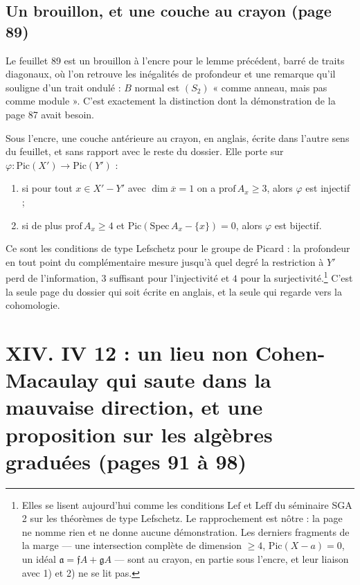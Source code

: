 \documentclass[11pt,a4paper]{article}
\begin{document}
\subsection*{Un brouillon, et une couche au crayon (page 89)}

Le feuillet 89 est un brouillon à l'encre pour le lemme précédent, barré de
traits diagonaux, où l'on retrouve les inégalités de profondeur et une remarque
qu'il souligne d'un trait ondulé : $B$ normal est $(S_{2})$ « comme anneau, mais
pas comme module ». C'est exactement la distinction dont la démonstration de la
page 87 avait besoin.

Sous l'encre, une couche antérieure au crayon, en anglais, écrite dans l'autre
sens du feuillet, et sans rapport avec le reste du dossier. Elle porte sur
$\varphi : \mathrm{Pic}(X') \to \mathrm{Pic}(Y')$ :

\begin{enumerate}
  \item[1)] si pour tout $x \in X' - Y'$ avec $\dim \overline{x} = 1$ on a
  $\mathrm{prof}\,A_{x} \geqslant 3$, alors $\varphi$ est injectif ;
  \item[2)] si de plus $\mathrm{prof}\,A_{x} \geqslant 4$ et
  $\mathrm{Pic}(\mathrm{Spec}\,A_{x} - \{x\}) = 0$, alors $\varphi$ est bijectif.
\end{enumerate}

Ce sont les conditions de type Lefschetz pour le groupe de Picard : la
profondeur en tout point du complémentaire mesure jusqu'à quel degré la
restriction à $Y'$ perd de l'information, $3$ suffisant pour l'injectivité et
$4$ pour la surjectivité.\footnote{Elles se lisent aujourd'hui comme les
conditions $\mathrm{Lef}$ et $\mathrm{Leff}$ du séminaire SGA 2 sur les
théorèmes de type Lefschetz. Le rapprochement est nôtre : la page ne nomme rien
et ne donne aucune démonstration. Les derniers fragments de la marge — une
intersection complète de dimension $\geqslant 4$, $\mathrm{Pic}(X - a) = 0$, un
idéal $\mathfrak{a} = \mathfrak{f}A + \mathfrak{g}A$ — sont au crayon, en partie
sous l'encre, et leur liaison avec 1) et 2) ne se lit pas.} C'est la seule page
du dossier qui soit écrite en anglais, et la seule qui regarde vers la
cohomologie.

\section*{XIV. IV 12 : un lieu non Cohen-Macaulay qui saute dans la mauvaise direction, et une proposition sur les algèbres graduées (pages 91 à 98)}
\end{document}
